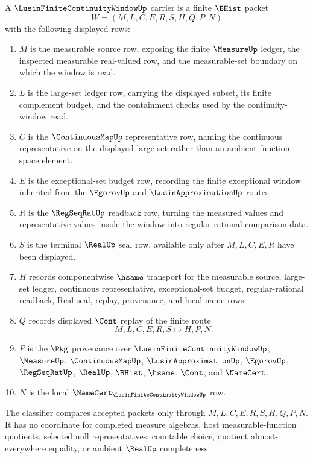 \begin{definition}\label{def:lusin-finite-continuity-window-carrier}
A $\LusinFiniteContinuityWindowUp$ carrier is a finite $\BHist$ packet
$$
W=(M,L,C,E,R,S,H,Q,P,N)
$$
with the following displayed rows:
\begin{enumerate}
\item $M$ is the measurable source row, exposing the finite $\MeasureUp$ ledger, the inspected measurable real-valued row, and the measurable-set boundary on which the window is read.
\item $L$ is the large-set ledger row, carrying the displayed subset, its finite complement budget, and the containment checks used by the continuity-window read.
\item $C$ is the $\ContinuousMapUp$ representative row, naming the continuous representative on the displayed large set rather than an ambient function-space element.
\item $E$ is the exceptional-set budget row, recording the finite exceptional window inherited from the $\EgorovUp$ and $\LusinApproximationUp$ routes.
\item $R$ is the $\RegSeqRatUp$ readback row, turning the measured values and representative values inside the window into regular-rational comparison data.
\item $S$ is the terminal $\RealUp$ seal row, available only after $M,L,C,E,R$ have been displayed.
\item $H$ records componentwise $\hsame$ transport for the measurable source, large-set ledger, continuous representative, exceptional-set budget, regular-rational readback, Real seal, replay, provenance, and local-name rows.
\item $Q$ records displayed $\Cont$ replay of the finite route
$$
M,L,C,E,R,S \longmapsto H,P,N .
$$
\item $P$ is the $\Pkg$ provenance over $\LusinFiniteContinuityWindowUp$, $\MeasureUp$, $\ContinuousMapUp$, $\LusinApproximationUp$, $\EgorovUp$, $\RegSeqRatUp$, $\RealUp$, $\BHist$, $\hsame$, $\Cont$, and $\NameCert$.
\item $N$ is the local $\NameCert_{\LusinFiniteContinuityWindowUp}$ row.
\end{enumerate}
The classifier compares accepted packets only through $M,L,C,E,R,S,H,Q,P,N$. It has no coordinate for completed measure algebras, host measurable-function quotients, selected null representatives, countable choice, quotient almost-everywhere equality, or ambient $\RealUp$ completeness.
\end{definition}

